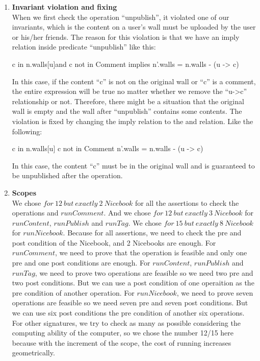 \documentclass[titlepage]{article}
\begin{document}
\begin{enumerate}[\bf\large 1.]
    \item {\bf\large Invariant violation and fixing}\\[1ex]
    When we first check the operation “unpublish”, it violated one of our invariants, which is the content on a user’s wall must be uploaded by the user or his/her friends. The reason for this violation is that we have an imply relation inside predicate “unpublish” like this:
    \begin{alloy}
c in n.walls[u]and c not in Comment implies n'.walls = n.walls - (u -> c)
    \end{alloy}
    In this case, if the content “c” is not on the original wall or “c” is a comment, the entire expression will be true no matter whether we remove the “u->c” relationship or not. Therefore, there might be a situation that the original wall is empty and the wall after “unpublish” contains some contents. The violation is fixed by changing the imply relation to the and relation. Like the following:
    \begin{alloy}
c in n.walls[u]
c not in Comment
n'.walls = n.walls - (u -> c)        
    \end{alloy}
    In this case, the content “c” must be in the original wall and is guaranteed to be unpublished after the operation.
    \item {\bf\large Scopes}\\[1ex]
    We chose $for~12~but~exactly~2~Nicebook$ for all the assertions to check the operations and $runComment$. 
    And we chose $for~12~but~exactly~3~Nicebook$ for $runContent$, $runPublish$ and $runTag$.
    We chose $for~15~but~exactly~8~Nicebook$ for $runNicebook$.
    Because for all assertions, we need to check the pre and post condition of the Nicebook, and 2 Nicebooks are enough.
    For $runComment$, we need to prove that the operation is feasible and only one pre and one post conditions are enough.
    For $runContent$, $runPublish$ and $runTag$, we need to prove two operations are feasible so we need two pre and two post conditions. But we can use a post condition of one operaition as the pre condition of another operation.
    For $runNicebook$, we need to prove seven operations are feasible so we need seven pre and seven post conditions. But we can use six post conditions the pre condition of another six operations.
    For other signatures, we try to check as many as possible considering the computing ability of the computer, so we chose the number 12/15 here because with the increment of the scope, the cost of running increases geometrically.\\{}
\end{enumerate}
\end{document}
